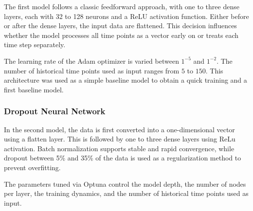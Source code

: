 The first model follows a classic feedforward approach, with one to three dense layers, each with 32 to 128 neurons and a ReLU activation function. Either before or after the dense layers, the input data are flattened. This decision influences whether the model processes all time points as a vector early on or treats each time step separately.

The learning rate of the Adam optimizer is varied between $1^{-5}$ and $1^{-2}$. The number of historical time points used as input ranges from $5$ to $150$. This architecture was used as a simple baseline model to obtain a quick training and a first baseline model.




\subsubsection{Dropout Neural Network}

In the second model, the data is first converted into a one-dimensional vector using a flatten layer. This is followed by one to three dense layers using ReLu activation. Batch normalization supports stable and rapid convergence, while dropout between 5\% and 35\% of the data is used as a regularization method to prevent overfitting.

The parameters tuned via Optuna control the model depth, the number of nodes per layer, the training dynamics, and the number of historical time points used as input.


